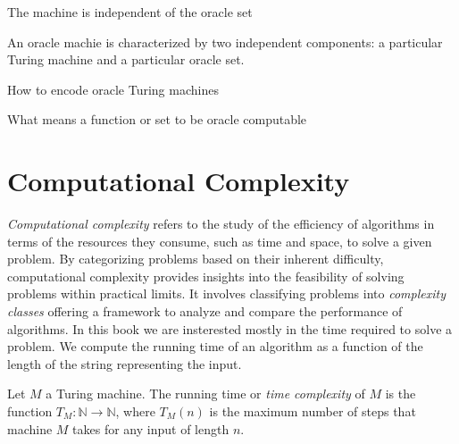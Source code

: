 \begin{proposition}
\end{proposition}

{\color{red} The machine is independent of the oracle set}

\begin{proposition}
\end{proposition}

{\color{red} An oracle machie is characterized by two independent components: a particular Turing machine and a particular oracle set.}

{\color{red} How to encode oracle Turing machines}

\begin{example}
\end{example}

{\color{red} What means a function or set to be oracle computable}

\begin{definition}
\end{definition}

%
%

\section{Computational Complexity}
\label{sec:computational_complexity}

\emph{Computational complexity} refers to the study of the efficiency of algorithms in terms of the resources they consume, such as time and space, to solve a given problem. By categorizing problems based on their inherent difficulty, computational complexity provides insights into the feasibility of solving problems within practical limits. It involves classifying problems into \emph{complexity classes} offering a framework to analyze and compare the performance of algorithms. In this book we are insterested mostly in the time required to solve a problem. We compute the running time of an algorithm as a function of the length of the string representing the input.

\begin{definition}
Let $M$ a Turing machine. The running time or \emph{time complexity} of $M$ is the function $T_M:\mathbb{N} \to \mathbb{N}$, where $T_M(n)$ is the maximum number of steps that machine $M$ takes for any input of length $n$.
\end{definition}

